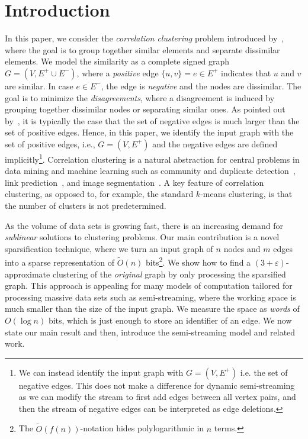 \documentclass[10pt,a4paper]{article}
\newcommand{\eps}{\ensuremath{\varepsilon}}
\begin{document}
\section{Introduction}
In this paper, we consider the \emph{correlation clustering} problem introduced by~\cite{bansal2004correlation}, where the goal is to group together similar elements and separate dissimilar elements.
We model the similarity as a complete signed graph $G = (V, E^+ \cup E^-)$, where a \emph{positive} edge $\{ u, v \} = e \in E^+$ indicates that $u$ and $v$ are similar.
In case $e \in E^-$, the edge is \emph{negative} and the nodes are dissimilar. 
The goal is to minimize the \emph{disagreements}, where a disagreement is induced by grouping together dissimilar nodes or separating similar ones.
As pointed out by~\cite{chierichetti2014correlation}, it is typically the case that the set of negative edges is much larger than the set of positive edges.
Hence, in this paper, we identify the input graph with the set of positive edges, i.e., $G = (V, E^+)$ and the negative edges are defined implicitly\footnote{We  can instead identify the input graph with $G = (V, E^+)$ i.e. the set of negative edges. This does not make a difference for dynamic semi-streaming as we can modify the stream to first add edges between all vertex pairs, and then the stream of negative edges can be interpreted as edge deletions.}.
Correlation clustering is a natural abstraction for central problems in data mining and machine learning such as community and duplicate detection~\cite{Arasu2009, Chen2012}, link prediction~\cite{Yaroslavtsev2018}, and image segmentation~\cite{Kim2011}.
A key feature of correlation clustering, as opposed to, for example, the standard $k$-means clustering, is that the number of clusters is not predetermined.

As the volume of data sets is growing fast, there is an increasing demand for \emph{sublinear} solutions to  clustering problems.
Our main contribution is a novel sparsification technique, where we turn an input graph of $n$ nodes and $m$ edges into a sparse representation of $\widetilde{O}(n)$ bits\footnote{The $\widetilde{O}(f(n))$-notation hides polylogarithmic in $n$ terms.}.
We show how to find a $(3 + \eps)$-approximate clustering of the \emph{original} graph by only processing the sparsified graph.
This approach is appealing for many models of computation tailored for processing massive data sets such as semi-streaming, where the working space is much smaller than the size of the input graph.
We measure the space as \emph{words} of $O(\log n)$ bits, which is just enough to store an identifier of an edge.
We now state our main result and then, introduce the semi-streaming model and related work.
\end{document}
